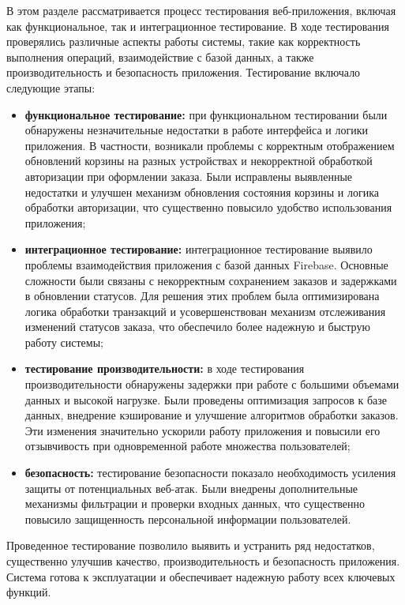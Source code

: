 {    В этом разделе рассматривается процесс тестирования веб-приложения, включая как функциональное, так и интеграционное тестирование. В ходе тестирования проверялись различные аспекты работы системы, такие как корректность выполнения операций, взаимодействие с базой данных, а также производительность и безопасность приложения. Тестирование включало следующие этапы:
    \begin{itemize}
        \item \textbf{функциональное тестирование:} при функциональном тестировании были обнаружены незначительные недостатки в работе интерфейса и логики приложения. В частности, возникали проблемы с корректным отображением обновлений корзины на разных устройствах и некорректной обработкой авторизации при оформлении заказа. Были исправлены выявленные недостатки и улучшен механизм обновления состояния корзины и логика обработки авторизации, что существенно повысило удобство использования приложения;
        \item \textbf{интеграционное тестирование:} интеграционное тестирование выявило проблемы взаимодействия приложения с базой данных Firebase. Основные сложности были связаны с некорректным сохранением заказов и задержками в обновлении статусов. Для решения этих проблем была оптимизирована логика обработки транзакций и усовершенствован механизм отслеживания изменений статусов заказа, что обеспечило более надежную и быструю работу системы;
        \item \textbf{тестирование производительности:} в ходе тестирования производительности обнаружены задержки при работе с большими объемами данных и высокой нагрузке. Были проведены оптимизация запросов к базе данных, внедрение кэширование и улучшение алгоритмов обработки заказов. Эти изменения значительно ускорили работу приложения и повысили его отзывчивость при одновременной работе множества пользователей;
        \item \textbf{безопасность:} тестирование безопасности показало необходимость усиления защиты от потенциальных веб-атак. Были внедрены дополнительные механизмы фильтрации и проверки входных данных, что существенно повысило защищенность персональной информации пользователей.
    \end{itemize}

    Проведенное тестирование позволило выявить и устранить ряд недостатков, существенно улучшив качество, производительность и безопасность приложения. Система готова к эксплуатации и обеспечивает надежную работу всех ключевых функций.\newpage
        
}
